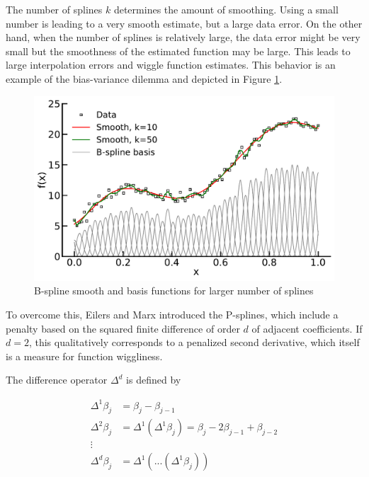 \documentclass[10pt,a4paper]{article}
\begin{document}
	
	The number of splines $k$ determines the amount of smoothing. Using a small number is leading to a very smooth estimate, but a large data error. On the other hand, when the number of splines is relatively large, the data error might be very small but the smoothness of the estimated function may be large. This leads to large interpolation errors and wiggle function estimates. This behavior is an example of the bias-variance dilemma and depicted in Figure \ref{fig:smooth_bf_large}. \cite{sammut2011}


	\begin{figure}[H]
	\centering
	\includegraphics[width=\linewidth]{thesisplots/smooth_wiggly_bf.pdf}
	\caption{B-spline smooth and basis functions for larger number of splines}
	\label{fig:smooth_bf_large}
	\end{figure}

	To overcome this, Eilers and Marx introduced the P-splines, which include a penalty based on the squared finite difference of order $d$ of adjacent coefficients. If $d=2$, this qualitatively  corresponds to a penalized second derivative, which itself is a measure for function wiggliness. \cite{eilers1996flexible}
	
	The difference operator $\Delta^d$ is defined by
		
	
	\begin{align*}
		\Delta^1 \beta_j &= \beta_j - \beta_{j-1} \\
		\Delta^2 \beta_j &= \Delta^1(\Delta^1 \beta_j) = \beta_j - 2\beta_{j-1} + \beta_{j-2} \\ 
	  	\vdots \\ 
	  	\Delta^d \beta_j &= \Delta^1(...(\Delta^1 \beta_j))
	\end{align*}
	
\end{document}
